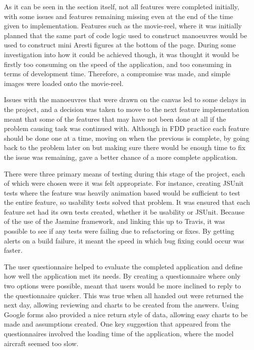 As it can be seen in the section itself, not all features were completed initially, with some issues and features remaining missing even at the end of the time given to implementation. Features such as the movie-reel, where it was initially planned that the same part of code logic used to construct manoeuvres would be used to construct mini Aresti figures at the bottom of the page. During some investigation into how it could be achieved though, it was thought it would be firstly too consuming on the speed of the application, and too consuming in terms of development time. Therefore, a compromise was made, and simple images were loaded onto the movie-reel.

Issues with the manoeuvres that were drawn on the canvas led to some delays in the project, and a decision was taken to move to the next feature implementation meant that some of the features that may have not been done at all if the problem causing task was continued with. Although in FDD practice each feature should be done one at a time, moving on when the previous is complete, by going back to the problem later on but making sure there would be enough time to fix the issue was remaining, gave a better chance of a more complete application.

There were three primary means of testing during this stage of the project, each of which were chosen were it was felt appropriate. For instance, creating JSUnit tests where the feature was heavily animation based would be sufficient to test the entire feature, so usability tests solved that problem. It was ensured that each feature set had its own tests created, whether it be usability or JSUnit. Because of the use of the Jasmine framework, and linking this up to Travis, it was possible to see if any tests were failing due to refactoring or fixes. By getting alerts on a build failure, it meant the speed in which bug fixing could occur was faster.

The user questionnaire helped to evaluate the completed application and define how well the application met its needs. By creating a questionnaire where only two options were possible, meant that users would be more inclined to reply to the questionnaire quicker. This was true when all handed out were returned the next day, allowing reviewing and charts to be created from the answers. Using Google forms also provided a nice return style of data, allowing easy charts to be made and assumptions created. One key suggestion that appeared from the questionnaires involved the loading time of the application, where the model aircraft seemed too slow.


